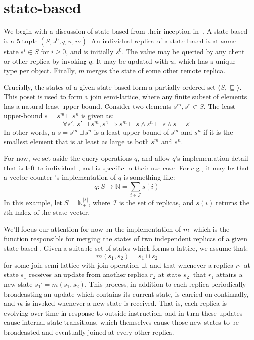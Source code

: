 \section{state-based \CRDTs}
\label{sec:state-based-crdts}
We begin with a discussion of state-based \CRDTs from their inception
in~\citep{shapiro11}. A state-based \CRDT is a 5-tuple $(S, s^0, q, u, m)$. An
individual replica of a state-based \CRDT is at some state $s^i \in S$ for $i \ge
0$, and is initially $s^0$. The value may be queried by any client or other
replica by invoking $q$. It may be updated with $u$, which has a unique type per
\CRDT object. Finally, $m$ merges the state of some other remote replica.

Crucially, the states of a given state-based \CRDT form a partially-ordered set
$\langle S, \sqsubseteq \rangle$. This poset is used to form a join
semi-lattice, where any finite subset of elements has a natural least
upper-bound. Consider two elements $s^m, s^n \in S$. The least upper-bound
$s = s^m \sqcup s^n$ is given as:
\[
  \forall s'.\; s' \sqsupseteq s^m, s^n \Rightarrow
    s^m \sqsubseteq s \land
    s^n \sqsubseteq s \land
    s \sqsubseteq s'
\]
In other words, a $s = s^m \sqcup s^n$ is a least upper-bound of $s^m$ and $s^n$
if it is the smallest element that is at least as large as both $s^m$ and $s^n$.

For now, we set aside the query operations $q$, and allow $q$'s implementation
detail that is left to individual \CRDTs, and is specific to their use-case. For
e.g., it may be that a vector-counter \CRDT's implementation of $q$ is
something like:
\[
  q : S \mapsto \mathbb{N} = \sum_{i \in \mathcal{I}} s(i)
\]
In this example, let $S = \mathbb{N}^{|\mathcal{I}|}_+$, where $\mathcal{I}$ is
the set of replicas, and $s(i)$ returns the $i$th index of the state vector.

We'll focus our attention for now on the implementation of $m$, which is the
function responsible for merging the states of two independent replicas of a
given state-based \CRDT. Given a suitable set of states which forms a lattice, we
assume that:
\[
  m(s_1, s_2) = s_1 \sqcup s_2
\]
for some join semi-lattice with join operation $\sqcup$, and that whenever a
\CRDT replica $r_1$ at state $s_1$ receives an update from another replica
$r_2$ at state $s_2$, that $r_1$ attains a new state $s_1' = m(s_1, s_2)$.
This process, in addition to each replica periodically broadcasting an update
which contains its current state, is carried on continually, and $m$ is
invoked whenever a new state is received. That is, each replica is evolving
over time in response to outside instruction, and in turn these updates cause
internal state transitions, which themselves cause those new states to be
broadcasted and eventually joined at every other replica.

